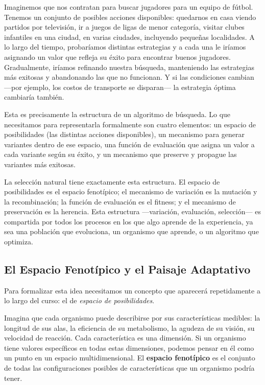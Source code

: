 \documentclass[
  letterpaper,
  DIV=11,
  numbers=noendperiod]{scrreprt}
\begin{document}
Imaginemos que nos contratan para buscar jugadores para un equipo de
fútbol. Tenemos un conjunto de posibles acciones disponibles: quedarnos
en casa viendo partidos por televisión, ir a juegos de ligas de menor
categoría, visitar clubes infantiles en una ciudad, en varias ciudades,
incluyendo pequeñas localidades. A lo largo del tiempo, probaríamos
distintas estrategias y a cada una le iríamos asignando un valor que
refleja su éxito para encontrar buenos jugadores. Gradualmente, iríamos
refinando nuestra búsqueda, manteniendo las estrategias más exitosas y
abandonando las que no funcionan. Y si las condiciones cambian ---por
ejemplo, los costos de transporte se disparan--- la estrategia óptima
cambiaría también.

Esta es precisamente la estructura de un algoritmo de búsqueda. Lo que
necesitamos para representarla formalmente son cuatro elementos: un
espacio de posibilidades (las distintas acciones disponibles), un
mecanismo para generar variantes dentro de ese espacio, una función de
evaluación que asigna un valor a cada variante según su éxito, y un
mecanismo que preserve y propague las variantes más exitosas.

La selección natural tiene exactamente esta estructura. El espacio de
posibilidades es el espacio fenotípico; el mecanismo de variación es la
mutación y la recombinación; la función de evaluación es el fitness; y
el mecanismo de preservación es la herencia. Esta estructura
---variación, evaluación, selección--- es compartida por todos los
procesos en los que algo aprende de la experiencia, ya sea una población
que evoluciona, un organismo que aprende, o un algoritmo que optimiza.

\subsection{El Espacio Fenotípico y el Paisaje
Adaptativo}\label{el-espacio-fenotuxedpico-y-el-paisaje-adaptativo}

Para formalizar esta idea necesitamos un concepto que aparecerá
repetidamente a lo largo del curso: el de \emph{espacio de
posibilidades}.

Imagina que cada organismo puede describirse por sus características
medibles: la longitud de sus alas, la eficiencia de su metabolismo, la
agudeza de su visión, su velocidad de reacción. Cada característica es
una dimensión. Si un organismo tiene valores específicos en todas estas
dimensiones, podemos pensar en él como un punto en un espacio
multidimensional. El \textbf{espacio fenotípico} es el conjunto de todas
las configuraciones posibles de características que un organismo podría
tener.
\end{document}
